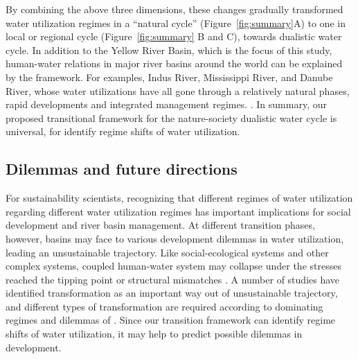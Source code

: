 \documentclass[9pt, twocolumn, twoside, lineno]{pnas-new}
\begin{document}
By combining the above three dimensions, these changes gradually transformed water utilization regimes in a “natural cycle” (Figure~\ref{fig:summary}A) to one in local or regional cycle (Figure~\ref{fig:summary} B and C), towards dualistic water cycle. In addition to the Yellow River Basin, which is the focus of this study, human-water relations in major river basins around the world can be explained by the framework. For examples, Indus River, Mississippi River, and Danube River, whose water utilizations have all gone through a relatively natural phases, rapid developments and integrated management regimes. \cite{bestAnthropogenicStressesWorld2019,cummingResilienceBigRiver2011}. In summary, our proposed transitional framework for the nature-society dualistic water cycle is universal, for identify regime shifts of water utilization.

\subsection*{Dilemmas and future directions}
For sustainability scientists, recognizing that different regimes of water utilization regarding different water utilization regimes has important implications for social development and river basin management.
At different transition phases, however, basins may face to various development dilemmas in water utilization, leading an unsustainable trajectory. 
Like social-ecological systems and other complex systems, coupled human-water system may collapse under the stresses reached the tipping point or structural mismatches 
\cite{reyersSocialEcologicalSystemsInsights2018,cummingQuantifyingSocialEcologicalScale2020,wangCOSUSTMs0530Review}. 
A number of studies have identified transformation as an important way out of unsustainable trajectory, and different types of transformation are required according to dominating regimes and dilemmas of \cite{scoonesTransformationsSustainabilityCombining2020a,steffenTrajectoriesEarthSystem2018}. 
Since our transition framework can identify regime shifts of water utilization, it may help to predict possible dilemmas in development.
\end{document}
